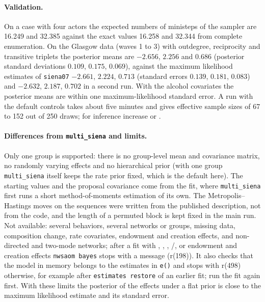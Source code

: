\paragraph{Validation.} On a case with four actors the expected numbers of ministeps of the sampler are 16.249 and 32.385 against the exact values 16.258 and 32.344 from complete enumeration. On the Glasgow data (waves 1 to 3) with outdegree, reciprocity and transitive triplets the posterior means are $-2.656$, $2.256$ and $0.686$ (posterior standard deviations $0.109$, $0.175$, $0.069$), against the maximum likelihood estimates of \texttt{siena07} $-2.661$, $2.224$, $0.713$ (standard errors $0.139$, $0.181$, $0.083$) and $-2.632$, $2.187$, $0.702$ in a second run. With the alcohol covariates the posterior means are within one maximum-likelihood standard error. A run with the default controls takes about five minutes and gives effective sample sizes of 67 to 152 out of 250 draws; for inference increase  or .

\paragraph{Differences from \texttt{multi\_siena} and limits.} Only one group is supported: there is no group-level mean and covariance matrix, no randomly varying effects and no hierarchical prior (with one group \texttt{multi\_siena} itself keeps the rate prior fixed, which is the default here). The starting values and the proposal covariance come from the \nwsaom{} fit, where \texttt{multi\_siena} first runs a short method-of-moments estimation of its own. The Metropolis--Hastings moves on the sequences were written from the published description, not from the code, and the length of a permuted block is kept fixed in the main run. Not available: several behaviors, several networks or groups, missing data, composition change, rate covariates, endowment and creation effects, and non-directed and two-mode networks; after a fit with , , , /,  or endowment and creation effects \texttt{nwsaom bayes} stops with a message (r(198)). It also checks that the model in memory belongs to the estimates in \texttt{e()} and stops with r(498) otherwise, for example after \texttt{estimates restore} of an earlier fit; run the fit again first. With these limits the posterior of the effects under a flat prior is close to the maximum likelihood estimate and its standard error.

